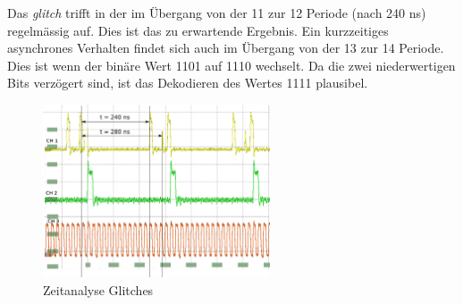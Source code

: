  Das \textit{glitch} trifft in der im Übergang von der 11 zur 12 Periode (nach 240 ns) regelmässig auf. Dies ist das zu erwartende Ergebnis. Ein kurzzeitiges asynchrones Verhalten findet sich auch im Übergang von der 13 zur 14 Periode. Dies ist wenn der binäre Wert 1101 auf 1110 wechselt. Da die zwei niederwertigen Bits verzögert sind, ist das Dekodieren des Wertes 1111 plausibel.\\
 
\begin{figure}[H]
	\includegraphics[width=0.6\textwidth]{images/glitch/Glitch_2_timing.png}
	\caption{Zeitanalyse Glitches}
	\label{fig.glitch.result_2}
\end{figure}



